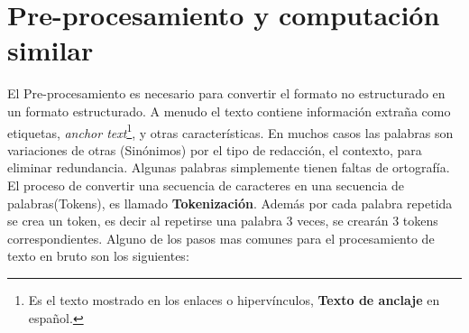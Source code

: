 \section[Pre-procesamiento]{Pre-procesamiento y computación similar}

El Pre-procesamiento es necesario para convertir el formato no estructurado en un formato estructurado.
A menudo el texto contiene información extraña como etiquetas, \textit{anchor text}\footnote{Es el texto mostrado en los enlaces o hipervínculos, \textbf{Texto de anclaje} en español.}, y otras características. En muchos casos las palabras son variaciones de otras (Sinónimos) por el tipo de redacción, el contexto, para eliminar redundancia. Algunas palabras simplemente tienen faltas de ortografía. El proceso de convertir una secuencia de caracteres en una secuencia de palabras(Tokens), es llamado \textbf{Tokenización}. Además por cada palabra repetida se crea un token, es decir al repetirse una palabra 3 veces, se crearán 3 tokens correspondientes. Alguno de los pasos mas comunes para el procesamiento de texto en bruto son los siguientes: 

